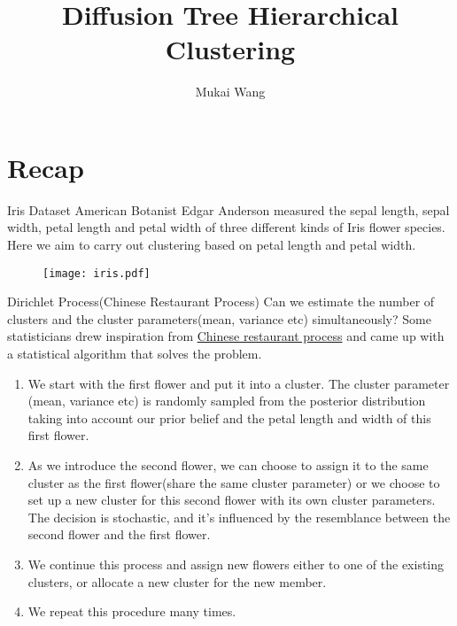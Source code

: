 \documentclass{beamer}
\title[Bayesian Hierarchical Clustering]{Diffusion Tree Hierarchical Clustering}
\author{Mukai Wang}
\begin{document}
	\begin{frame}
		\titlepage
	\end{frame}
	
	\section{Recap}
	\begin{frame}
		\tableofcontents
		[
		currentsection,
		currentsubsection,
		subsectionstyle=show/shaded/hide
		]
	\end{frame}
	
	\begin{frame}{Iris Dataset}
		American Botanist Edgar Anderson measured the sepal length, sepal width, petal length and petal width of three different kinds of Iris flower species. Here we aim to carry out clustering based on petal length and petal width.
		\begin{figure}[htbp]
		\centering
		\texttt{[image: iris.pdf]}
		\end{figure}
	\end{frame}
	
	\begin{frame}{Dirichlet Process(Chinese Restaurant Process)}
		Can we estimate the number of clusters and the cluster parameters(mean, variance etc) simultaneously? Some statisticians drew inspiration from 
		\href{https://topicmodels.west.uni-koblenz.de/ckling/tmt/crp.html?parameters=10&dp=1}{Chinese restaurant process} and came up with a statistical algorithm that solves the problem.
		
		\begin{enumerate}
			\item We start with the first flower and put it into a cluster. The cluster parameter (mean, variance etc) is randomly sampled from the posterior distribution taking into account our prior belief and the petal length and width of this first flower.
			\item As we introduce the second flower, we can choose to assign it to the same cluster as the first flower(share the same cluster parameter) or we choose to set up a new cluster for this second flower with its own cluster parameters. The decision is stochastic, and it's influenced by the resemblance between the second flower and the first flower.
			\item We continue this process and assign new flowers either to one of the existing clusters, or allocate a new cluster for the new member.
			\item We repeat this procedure many times. 
		\end{enumerate}
	\end{frame}	
	
\end{document}
